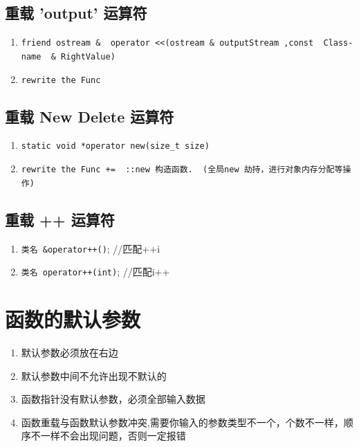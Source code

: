 \documentclass[UTF8,a4paper,12pt]{ctexbook} %
\begin{document}
	        \subsection{重载 'output' 运算符}
		        \begin{enumerate}[fullwidth,itemindent=2em]
		        	\item  \verb|friend ostream &  operator <<(ostream & outputStream ,const  Class-name  & RightValue)|
		        	\item  \verb|rewrite the Func|
		        \end{enumerate}
		        
	         \subsection{重载 New Delete 运算符}
		         \begin{enumerate}[fullwidth,itemindent=2em]
		         	\item  \verb|static void *operator new(size_t size)|
		         	\item  \verb|rewrite the Func +=  ::new 构造函数.  (全局new 劫持，进行对象内存分配等操作)|
		         \end{enumerate}
	         
	         \subsection{重载 ++ 运算符}
		          \begin{enumerate}[fullwidth,itemindent=2em]
		          	\item  	\verb|类名 &operator++()|;   //匹配++i
		          	\item  	\verb|类名 operator++(int)|; //匹配i++
		          \end{enumerate}
	 \section{函数的默认参数}
			 \begin{enumerate}[fullwidth,itemindent=2em]
			 	 \item   默认参数必须放在右边
			 	 \item   默认参数中间不允许出现不默认的
			 	 \item   函数指针没有默认参数，必须全部输入数据
			 	 \item   函数重载与函数默认参数冲突,需要你输入的参数类型不一个，个数不一样，顺序不一样不会出现问题，否则一定报错
			 \end{enumerate}
			 
\end{document}
